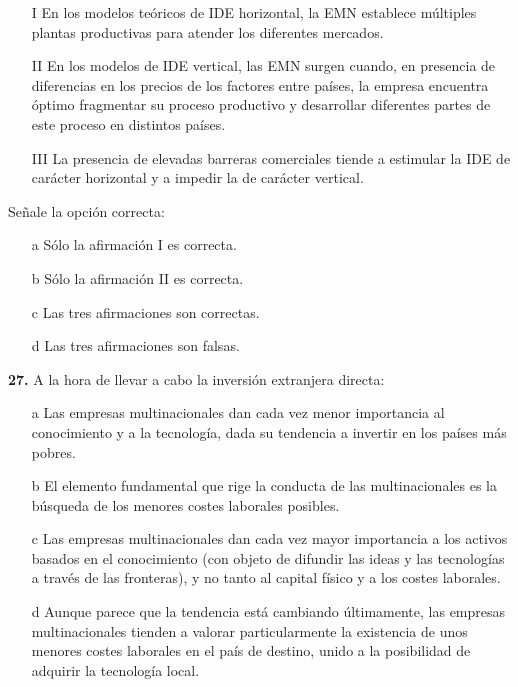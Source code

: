 \documentclass{nuevotema}
\begin{document}
\begin{itemize}
	\item[I] En los modelos teóricos de IDE horizontal, la EMN establece múltiples plantas productivas para atender los diferentes mercados.
	\item[II] En los modelos de IDE vertical, las EMN surgen cuando, en presencia de diferencias en los precios de los factores entre países, la empresa encuentra óptimo fragmentar su proceso productivo y desarrollar diferentes partes de este proceso en distintos países.
	\item[III] La presencia de elevadas barreras comerciales tiende a estimular la IDE de carácter horizontal y a impedir la de carácter vertical.	
\end{itemize}

Señale la opción correcta:

\begin{itemize}
	\item[a] Sólo la afirmación I es correcta.
	\item[b] Sólo la afirmación II es correcta.
	\item[c] Las tres afirmaciones son correctas.
	\item[d] Las tres afirmaciones son falsas.
\end{itemize}


\textbf{27.} A la hora de llevar a cabo la inversión extranjera directa:

\begin{itemize}
	\item[a] Las empresas multinacionales dan cada vez menor importancia al conocimiento y a la tecnología, dada su tendencia a invertir en los países más pobres. 
	\item[b] El elemento fundamental que rige la conducta de las multinacionales es la búsqueda de los menores costes laborales posibles.
	\item[c] Las empresas multinacionales dan cada vez mayor importancia a los activos basados en el conocimiento (con objeto de difundir las ideas y las tecnologías a través de las fronteras), y no tanto al capital físico y a los costes laborales.
	\item[d] Aunque parece que la tendencia está cambiando últimamente, las empresas multinacionales tienden a valorar particularmente la existencia de unos menores costes laborales en el país de destino, unido a la posibilidad de adquirir la tecnología local.
\end{itemize}
\end{document}
